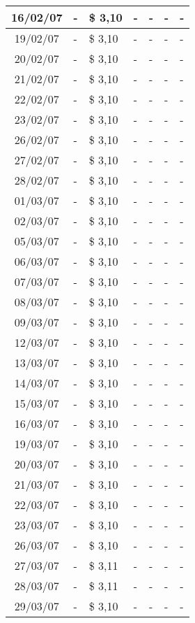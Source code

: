 \begin{center}
\begin{longtable}{|c|p{1.5cm}|p{1.5cm}|p{1.5cm}|p{1.5cm}|p{1.5cm}|p{1.5cm}|}
16/02/07 & - & \$ 3,10 & - & - & - & - \\ \hline
19/02/07 & - & \$ 3,10 & - & - & - & - \\ \hline
20/02/07 & - & \$ 3,10 & - & - & - & - \\ \hline
21/02/07 & - & \$ 3,10 & - & - & - & - \\ \hline
22/02/07 & - & \$ 3,10 & - & - & - & - \\ \hline
23/02/07 & - & \$ 3,10 & - & - & - & - \\ \hline
26/02/07 & - & \$ 3,10 & - & - & - & - \\ \hline
27/02/07 & - & \$ 3,10 & - & - & - & - \\ \hline
28/02/07 & - & \$ 3,10 & - & - & - & - \\ \hline
01/03/07 & - & \$ 3,10 & - & - & - & - \\ \hline
02/03/07 & - & \$ 3,10 & - & - & - & - \\ \hline
05/03/07 & - & \$ 3,10 & - & - & - & - \\ \hline
06/03/07 & - & \$ 3,10 & - & - & - & - \\ \hline
07/03/07 & - & \$ 3,10 & - & - & - & - \\ \hline
08/03/07 & - & \$ 3,10 & - & - & - & - \\ \hline
09/03/07 & - & \$ 3,10 & - & - & - & - \\ \hline
12/03/07 & - & \$ 3,10 & - & - & - & - \\ \hline
13/03/07 & - & \$ 3,10 & - & - & - & - \\ \hline
14/03/07 & - & \$ 3,10 & - & - & - & - \\ \hline
15/03/07 & - & \$ 3,10 & - & - & - & - \\ \hline
16/03/07 & - & \$ 3,10 & - & - & - & - \\ \hline
19/03/07 & - & \$ 3,10 & - & - & - & - \\ \hline
20/03/07 & - & \$ 3,10 & - & - & - & - \\ \hline
21/03/07 & - & \$ 3,10 & - & - & - & - \\ \hline
22/03/07 & - & \$ 3,10 & - & - & - & - \\ \hline
23/03/07 & - & \$ 3,10 & - & - & - & - \\ \hline
26/03/07 & - & \$ 3,10 & - & - & - & - \\ \hline
27/03/07 & - & \$ 3,11 & - & - & - & - \\ \hline
28/03/07 & - & \$ 3,11 & - & - & - & - \\ \hline
29/03/07 & - & \$ 3,10 & - & - & - & - \\ \hline

\end{longtable}
\end{center}

